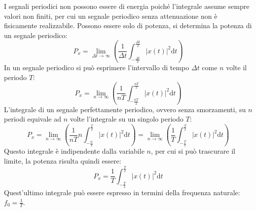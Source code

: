 \documentclass{article}
\newcommand{\df}{\mathrm{d}}
\numberwithin{equation}{subsection}
\begin{document}
I segnali periodici non possono essere di energia poiché l'integrale assume sempre valori non finiti, per cui un segnale periodico senza attenuazione non è fisicamente 
realizzabile. Possono essere solo di potenza, si determina la potenza di un segnale periodico:
\begin{equation*}
    P_x=\lim_{\Delta t\to\infty}\displaystyle\left(\frac{1}{\Delta t}\int_{-\frac{\Delta t}{2}}^{\frac{\Delta t}{2}}|x(t)|^2\df t\right)
\end{equation*}
In un segnale periodico si può esprimere l'intervallo di tempo $\Delta t$ come $n$ volte il periodo $T$:
\begin{equation*}
    P_x=\lim_{n\to\infty}\displaystyle\left(\frac{1}{n T}\int_{-\frac{nT}{2}}^{\frac{nT}{2}}|x(t)|^2\df t\right)
\end{equation*}
L'integrale di un segnale perfettamente periodico, ovvero senza smorzamenti, su $n$ periodi equivale ad $n$ volte l'integrale su un singolo periodo $T$:
\begin{equation*}
    P_x=\lim_{n\to\infty}\displaystyle\left(\frac{1}{n T}n\int_{-\frac{n}{2}}^{\frac{T}{2}}|x(t)|^2\df t\right)=\lim_{n\to\infty}\displaystyle\left(\frac{1}{T}\int_{-\frac{T}{2}}^{\frac{T}{2}}|x(t)|^2\df t\right)
\end{equation*} 
Questo integrale è indipendente dalla variabile $n$, per cui si può trascurare il limite, la potenza risulta quindi essere:
\begin{equation}
    P_x=\displaystyle\frac{1}{T}\int_{-\frac{T}{2}}^{\frac{T}{2}}|x(t)|^2\df t
\end{equation}
Quest'ultimo integrale può essere espresso in termini della frequenza naturale: $f_0=\frac{1}{T}$. 
\end{document}
